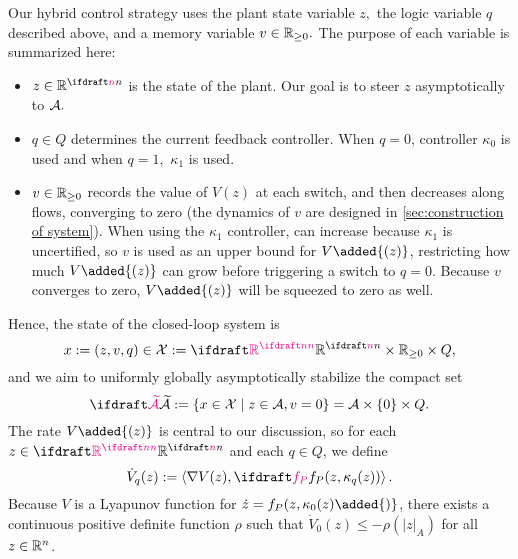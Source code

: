 Our hybrid control strategy uses 
the plant state variable $z,$
the logic variable $q$ described above, and
a memory variable $v \in \mathbb{R}_{\geq0}.$
The purpose of each variable is summarized here:
\begin{itemize}
    \item $z \in \reals^\nplant$ is the state of the plant. 
    Our goal is to steer $z$ asymptotically to ${\mathcal{A}}.$
    \item $q \in Q$ determines the current feedback controller. 
    When $q = 0$, controller $\kappa_0$ is used
    and when $q = 1,$ $\kappa_1$ is used.
    \item $v \in \mathbb{R}_{\geq0}$ records the value of $V(z)$ at each switch, 
    and then decreases along flows, converging to zero 
    (the dynamics of $v$ are designed in 
    \cref{sec:construction of system}). 
    When using the $\kappa_1$ controller, 
     can increase because $\kappa_1$ is uncertified,
    so $v$ is used as an upper bound for $V\added{(z)}$, 
    restricting how much $V\added{(z)}$ can grow before triggering a
    switch to $q = 0$. Because $v$ converges to zero, 
    $V\added{(z)}$ will be squeezed to zero as well.
\end{itemize}
Hence, the state of the closed-loop system is
$$x := (z, v, q) \in \calX := \plantstatespace \times \nnreals \times Q,$$
and we aim to uniformly globally 
asymptotically stabilize the compact set  
\begin{equation}
    \label{eq:Ax}
    \calAX := \setdef{x \in \calX \mid z\in \calA, v = 0} 
            = \calA \times \{0\} \times Q.
\end{equation}
The rate  $V\added{(z)}$
is central to our discussion, so for each 
$z \in \plantstatespace$ and each $q\in Q$, we define 
$$\dot V_{q}(z) := \ip{\del V(z)}{\fp(z, \kappa_{q}(z))}.$$
Because $V$ is a Lyapunov function for $\dot z = f_P(z, \kappa_0(z)\added{)}$, 
there exists a continuous positive definite function $\rho$ such
that $\dot V_0(z) \leq -\rho(|z|_A)$ 
for all $z\in \mathbb{R}^n$.

